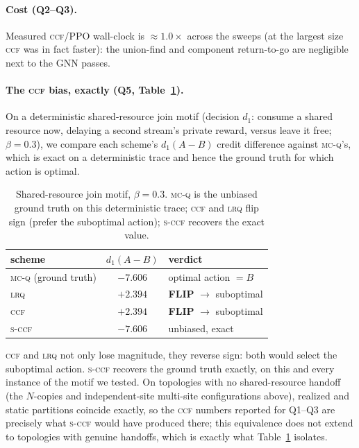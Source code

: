 \documentclass[review,authoryear,3p,times]{elsarticle}
\newcommand{\ccf}{\textsc{ccf}}
\newcommand{\sccf}{\textsc{s-ccf}}
\newcommand{\mcq}{\textsc{mc-q}}
\newcommand{\lrq}{\textsc{lrq}}
\begin{document}
\paragraph{Cost (Q2--Q3).} Measured \ccf{}/PPO wall-clock is $\approx1.0\times$
across the sweeps (at the largest size \ccf{} was in fact faster): the
union-find and component return-to-go are negligible next to the GNN passes.

\paragraph{The \ccf{} bias, exactly (Q5, Table~\ref{tab:flip}).} On a
deterministic shared-resource join motif (decision $d_1$: consume a shared
resource now, delaying a second stream's private reward, versus leave it
free; $\beta=0.3$), we compare each scheme's $d_1(A{-}B)$ credit difference
against \mcq's, which is exact on a deterministic trace and hence the ground
truth for which action is optimal.

\begin{table}[t]
\centering
\caption{Shared-resource join motif, $\beta=0.3$. \mcq{} is the unbiased
ground truth on this deterministic trace; \ccf{} and \lrq{} flip sign
(prefer the suboptimal action); \sccf{} recovers the exact value.}
\label{tab:flip}
\begin{tabular}{lcl}
\toprule
scheme & $d_1(A-B)$ & verdict \\
\midrule
\mcq{} (ground truth) & $-7.606$ & optimal action $=B$ \\
\lrq{} & $+2.394$ & \textbf{FLIP} $\to$ suboptimal \\
\ccf{} & $+2.394$ & \textbf{FLIP} $\to$ suboptimal \\
\sccf{} & $-7.606$ & unbiased, exact \\
\bottomrule
\end{tabular}
\end{table}

\ccf{} and \lrq{} not only lose magnitude, they reverse sign: both would
select the suboptimal action. \sccf{} recovers the ground truth exactly, on
this and every instance of the motif we tested. On topologies with no
shared-resource handoff (the $N$-copies and independent-site multi-site
configurations above), realized and static partitions coincide exactly, so
the \ccf{} numbers reported for Q1--Q3 are precisely what \sccf{} would have
produced there; this equivalence does not extend to topologies with genuine
handoffs, which is exactly what Table~\ref{tab:flip} isolates.
\end{document}
